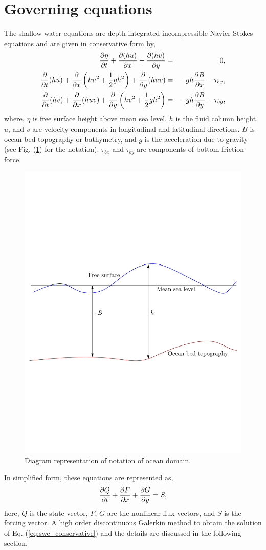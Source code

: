 \section{Governing equations}
\label{sec:governing}
The shallow water equations are depth-integrated incompressible Navier-Stokes equations and are given in conservative form by,
\begin{eqnarray}
\label{eq:swe}
\frac{\partial \eta}{\partial t} + \frac{\partial (hu)}{\partial x} + \frac{\partial (hv)}{\partial y} &=& 0, \nonumber \\
\frac{\partial }{\partial t}(hu) + \frac{\partial }{\partial x}\left(hu^2 + \frac{1}{2}gh^2 \right) + \frac{\partial }{\partial y} (huv)&=& - gh\frac{\partial B}{\partial x} - \tau_{bx}, \nonumber \\
\frac{\partial }{\partial t}(hv) + \frac{\partial }{\partial x}(huv) + \frac{\partial }{\partial y}\left( hv^2 + \frac{1}{2}gh^2\right) &=&  -gh\frac{\partial B}{\partial y} - \tau_{by},
\end{eqnarray}
where, $\eta$ is free surface height above mean sea level, $h$ is the fluid column height, $u$, and $v$ are velocity components in longitudinal and latitudinal directions. $B$ is ocean bed topography or bathymetry, and $g$ is the acceleration due to gravity (see Fig. (\ref{fig:notation})  for the notation). $\tau_{bx}$ and $\tau_{by}$ are components of bottom friction force.
\begin{figure}[h!]
  \begin{center}
    \includegraphics[trim=0cm 8cm 0cm 8cm,clip=true,width=0.5\linewidth]{./figures/bathymetry.pdf}
\caption{Diagram representation of notation of ocean domain.}
\label{fig:notation}
\end{center}
\end{figure}

\noindent In simplified form, these equations are represented as,
\begin{equation}
\label{eq:swe_conservative}
\frac{\partial Q}{\partial t} + \frac{\partial F}{\partial x} + \frac{\partial G}{\partial y} = S,
\end{equation}
here, $Q$ is the state vector, $F$, $G$ are the nonlinear flux vectors, and $S$ is the forcing vector. A high order discontinuous Galerkin method to obtain the solution of  Eq. (\ref{eq:swe_conservative}) and the details are discussed in the following  section.

